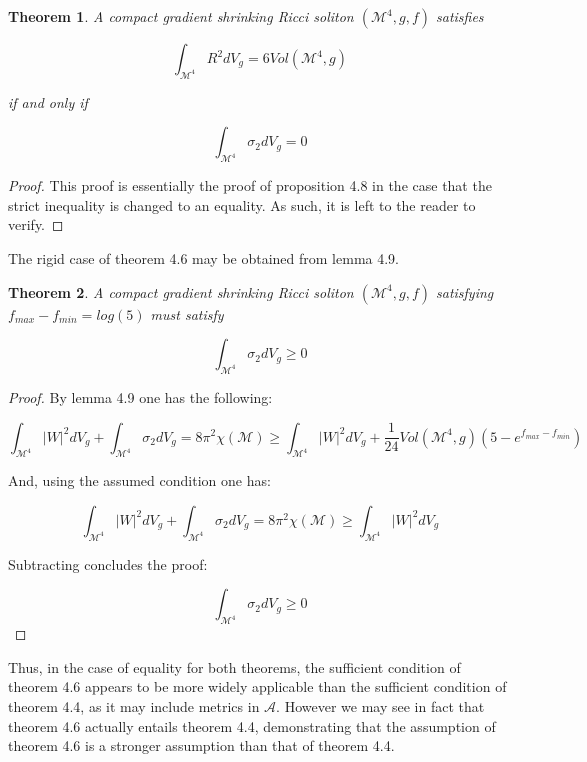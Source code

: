 \documentclass[openany, amssymb, psamsfonts]{amsart}
\newtheorem{thm}{Theorem}[section]
\theoremstyle{definition}
\numberwithin{equation}{section}
\begin{document}
\begin{thm}
A compact gradient shrinking Ricci soliton $(\mathcal{M}^4, g, f)$ satisfies

$$\int_{\mathcal{M}^4} R^2 dV_g = 6 Vol(\mathcal{M}^4, g)$$

if and only if

$$\int_{\mathcal{M}^4} \sigma_2 dV_g = 0$$

\end{thm}

\begin{proof}
This proof is essentially the proof of proposition 4.8 in the case that the strict inequality is changed to an equality. As such, it is left to the reader to verify. 
\end{proof}


The rigid case of theorem 4.6 may be obtained from lemma 4.9.

\begin{thm}
A compact gradient shrinking Ricci soliton $(\mathcal{M}^4, g, f)$ satisfying $f_{max} - f_{min} = log(5)$ must satisfy

$$\int_{\mathcal{M}^4} \sigma_2 dV_g \geq 0$$

\end{thm}

\begin{proof}
By lemma 4.9 one has the following:

$$\int_{\mathcal{M}^4} |W|^2 dV_g + \int_{\mathcal{M}^4} \sigma_2 dV_g = 8\pi^2 \chi(\mathcal{M}) \geq \int_{\mathcal{M}^4} |W|^2 dV_g + \frac{1}{24}Vol(\mathcal{M}^4, g)(5 - e^{f_{max} - f_{min}})$$

And, using the assumed condition one has:

$$\int_{\mathcal{M}^4} |W|^2 dV_g + \int_{\mathcal{M}^4} \sigma_2 dV_g = 8\pi^2 \chi(\mathcal{M}) \geq \int_{\mathcal{M}^4} |W|^2 dV_g$$

Subtracting concludes the proof:


$$\int_{\mathcal{M}^4} \sigma_2 dV_g \geq 0$$


\end{proof}

Thus, in the case of equality for both theorems, the sufficient condition of theorem 4.6 appears to be more widely applicable than the sufficient condition of theorem 4.4, as it may include metrics in $\mathcal{A}$. However we may see in fact that theorem 4.6 actually entails theorem 4.4, demonstrating that the assumption of theorem 4.6 is a stronger assumption than that of theorem 4.4.
\end{document}
